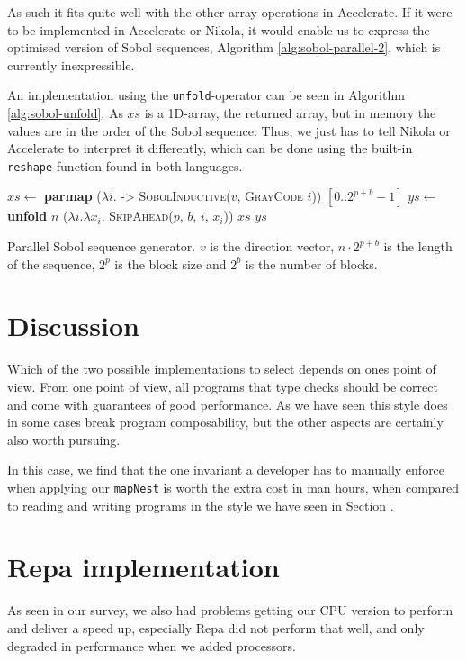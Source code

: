 As such it fits quite well with the other array operations in
Accelerate. If it were to be implemented in Accelerate or Nikola, it
would enable us to express the optimised version of Sobol sequences,
Algorithm \ref{alg:sobol-parallel-2}, which is currently
inexpressible. 

An implementation using the \lstinline{unfold}-operator can be seen in
Algorithm \ref{alg:sobol-unfold}. As $xs$ is a 1D-array, the returned
array, but in memory the values are in the order of the Sobol
sequence. Thus, we just has to tell Nikola or Accelerate to interpret
it differently, which can be done using the built-in
\lstinline{reshape}-function found in both languages.

\begin{algorithm}
  \begin{algorithmic}
    \State $xs \gets$ \textbf{parmap} ($\lambda i$. -> \textsc{SobolInductive}($v$, \textsc{GrayCode} $i$)) $[0..2^{p+b}-1]$
    \State $ys \gets$ \textbf{unfold} $n$ ($\lambda i. \lambda x_i$. \textsc{SkipAhead}($p$, $b$, $i$, $x_i$)) $xs$
    \State \Return $ys$
    \EndFunction
  \end{algorithmic}
  \caption{Parallel Sobol sequence generator. $v$ is the direction
    vector, $n \cdot 2^{p+b}$ is the length of the sequence, $2^p$ is the block size
    and $2^b$ is the number of blocks.}
  \label{alg:sobol-unfold}
\end{algorithm}


\section{Discussion}
Which of the two possible implementations to select depends on ones
point of view. From one point of view, all programs that type checks
should be correct and come with guarantees of good performance. As we
have seen this style does in some cases break program composability,
but the other aspects are certainly also worth pursuing.

In this case, we find that the one invariant a developer has to
manually enforce when applying our \lstinline{mapNest} is worth the
extra cost in man hours, when compared to reading and writing programs
in the style we have seen in Section .


\section{Repa implementation}
As seen in our survey, we also had problems getting our CPU version to
perform and deliver a speed up, especially Repa did not perform that
well, and only degraded in performance when we added processors.


